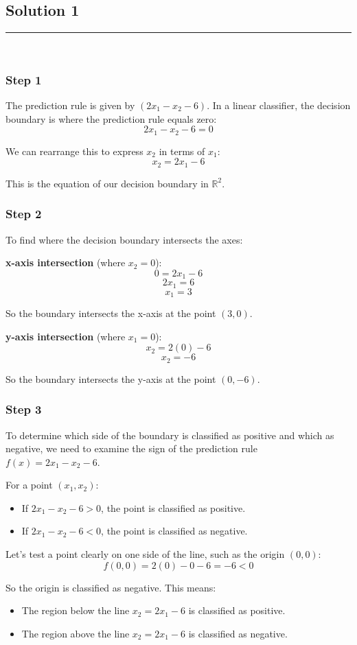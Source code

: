 \documentclass{article}
\begin{document}
\pagestyle{fancy}

\subsection*{Solution 1}
\noindent\rule{\textwidth}{0.4pt}\\

\subsubsection*{Step 1}
\parbox{\textwidth}{
The prediction rule is given by $\left(2 x_{1}-x_{2}-6\right)$. In a linear classifier, the decision boundary is where the prediction rule equals zero:
$$2 x_{1}-x_{2}-6 = 0$$

We can rearrange this to express $x_2$ in terms of $x_1$:
$$x_{2} = 2 x_{1} - 6$$

This is the equation of our decision boundary in $\mathbb{R}^{2}$.
}

\subsubsection*{Step 2}
\parbox{\textwidth}{
To find where the decision boundary intersects the axes:

\textbf{x-axis intersection} (where $x_2 = 0$):
$$0 = 2x_1 - 6$$
$$2x_1 = 6$$
$$x_1 = 3$$

So the boundary intersects the x-axis at the point $(3, 0)$.

\textbf{y-axis intersection} (where $x_1 = 0$):
$$x_2 = 2(0) - 6$$
$$x_2 = -6$$

So the boundary intersects the y-axis at the point $(0, -6)$.
}

\subsubsection*{Step 3}
\parbox{\textwidth}{
To determine which side of the boundary is classified as positive and which as negative, we need to examine the sign of the prediction rule $f(x) = 2x_1 - x_2 - 6$.

For a point $(x_1, x_2)$:
\begin{itemize}
    \item If $2x_1 - x_2 - 6 > 0$, the point is classified as positive.
    \item If $2x_1 - x_2 - 6 < 0$, the point is classified as negative.
\end{itemize}

Let's test a point clearly on one side of the line, such as the origin $(0,0)$:
$$f(0,0) = 2(0) - 0 - 6 = -6 < 0$$

So the origin is classified as negative. This means:
\begin{itemize}
    \item The region below the line $x_2 = 2x_1 - 6$ is classified as positive.
    \item The region above the line $x_2 = 2x_1 - 6$ is classified as negative.
\end{itemize}
}
\end{document}
